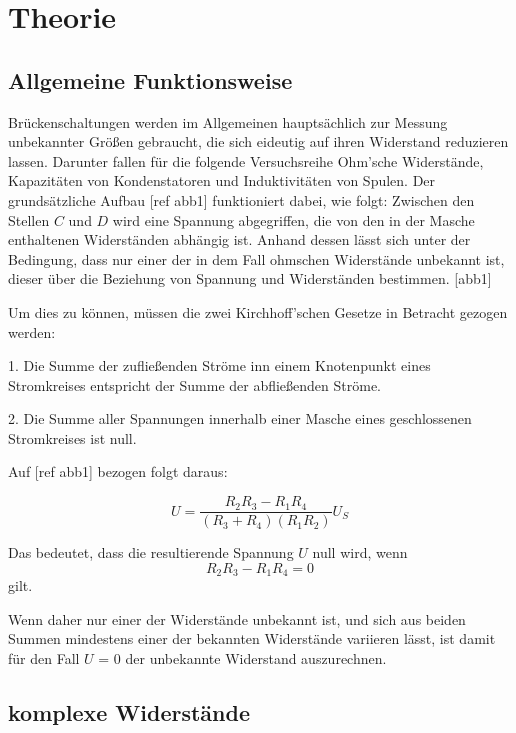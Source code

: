 \section{Theorie}
\label{sec:Theorie}

\subsection{Allgemeine Funktionsweise}

Brückenschaltungen werden im Allgemeinen hauptsächlich zur Messung unbekannter Größen 
gebraucht, die sich eideutig auf ihren Widerstand reduzieren lassen. Darunter fallen für
die folgende Versuchsreihe Ohm'sche Widerstände, Kapazitäten von Kondenstatoren und 
Induktivitäten von Spulen. Der grundsätzliche Aufbau [ref abb1] funktioniert dabei, wie folgt:
Zwischen den Stellen $C$ und $D$ wird eine Spannung abgegriffen, die von den in der Masche 
enthaltenen Widerständen abhängig ist. Anhand dessen lässt sich unter der Bedingung, dass 
nur einer der in dem Fall ohmschen Widerstände unbekannt ist, dieser über die Beziehung
von Spannung und Widerständen bestimmen. 
[abb1]

Um dies zu können, müssen die zwei Kirchhoff'schen Gesetze in Betracht gezogen werden:

1.  Die Summe der zufließenden Ströme inn einem Knotenpunkt eines Stromkreises entspricht
    der Summe der abfließenden Ströme.

2.  Die Summe aller Spannungen innerhalb einer Masche eines geschlossenen Stromkreises
    ist null.

Auf [ref abb1] bezogen folgt daraus:

\begin{equation}
    U = \frac{{R_2}{R_3}-{R_1}{R_4}}{({R_3}+{R_4})({R_1}{R_2})}U_S 
\end{equation}

Das bedeutet, dass die resultierende Spannung $U$ null wird, wenn 
\begin{equation}
    R_2 R_3 - R_1 R_4 = 0
\end{equation}
gilt.

Wenn daher nur einer der Widerstände unbekannt ist, und sich aus beiden Summen mindestens einer
der bekannten Widerstände variieren lässt, ist damit für den Fall $U$ = 0 der unbekannte Widerstand
auszurechnen.

\subsection{komplexe Widerstände}


